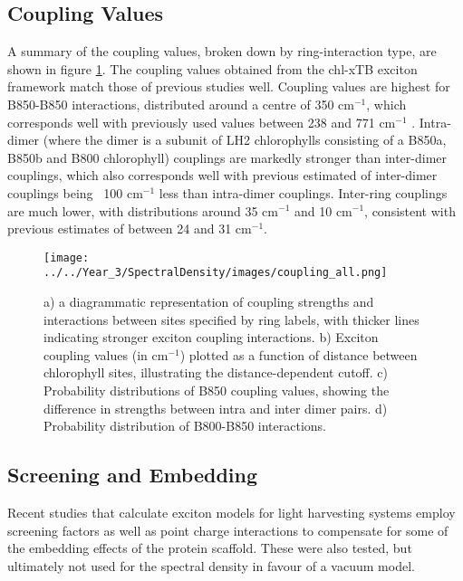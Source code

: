 \subsection{Coupling Values}
\label{subsec:coupling_values}

A summary of the coupling values, broken down by ring-interaction type, are shown
in figure \ref{fig:coupling_all}.
The coupling values obtained from the chl-xTB exciton framework match those of previous
studies well. Coupling values are highest for B850-B850 interactions, distributed
around a centre of 350 $\text{cm}^{-1}$, which corresponds well with previously 
used values between 238 and 771 $\text{cm}^{-1}$ \cite{Cogdell2006}. Intra-dimer
(where the dimer is a subunit of LH2 chlorophylls consisting of a B850a, B850b and
B800 chlorophyll) couplings are markedly stronger than inter-dimer couplings, which
also corresponds well with previous estimated of inter-dimer couplings being ~100 
$\text{cm}^{-1}$ less than intra-dimer couplings. Inter-ring couplings are much 
lower, with distributions around 35 $\text{cm}^{-1}$ and 10 $\text{cm}^{-1}$, consistent
with previous estimates of between 24 and 31 $\text{cm}^{-1}$.

\begin{figure}
    \centering
    \texttt{[image: ../../Year\_3/SpectralDensity/images/coupling\_all.png]}
    \label{fig:coupling_all}
    \caption{a) a diagrammatic representation of coupling strengths and interactions
    between sites specified by ring labels, with thicker lines indicating stronger
    exciton coupling interactions. b) Exciton coupling values (in $\text{cm}^{-1}$)
    plotted as a function of distance between chlorophyll sites, illustrating the
    distance-dependent cutoff. c) Probability distributions of B850 coupling values,
    showing the difference in strengths between intra and inter dimer pairs. d) 
    Probability distribution of B800-B850 interactions.}
\end{figure}

\subsection{Screening and Embedding}
\label{subsec:screening}

Recent studies that calculate exciton models for light harvesting systems employ
screening factors as well as point charge interactions to compensate for some of
the embedding effects of the protein scaffold. These were also tested, but ultimately
not used for the spectral density in favour of a vacuum model.


